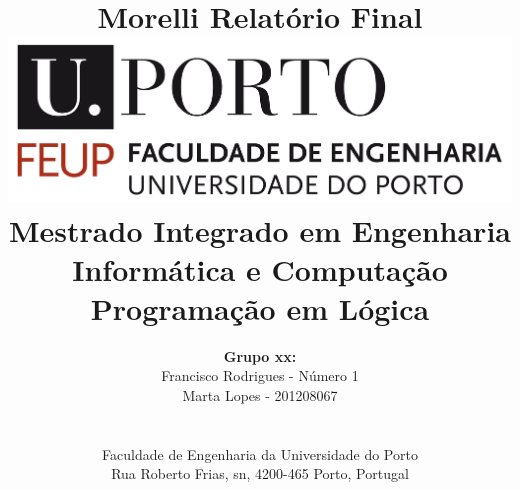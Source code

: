 \documentclass[a4paper]{article}
\begin{document}
\setlength{\textwidth}{16cm}
\setlength{\textheight}{22cm}

\title{\Huge\textbf{Morelli}\linebreak\linebreak\linebreak
\Large\textbf{Relatório Final}\linebreak\linebreak
\linebreak\linebreak
\includegraphics[scale=0.1]{feup-logo.png}\linebreak\linebreak
\linebreak\linebreak
\Large{Mestrado Integrado em Engenharia Informática e Computação} \linebreak\linebreak
\Large{Programação em Lógica}\linebreak
}

\author{\textbf{Grupo xx:}\\ Francisco Rodrigues - Número 1 \\ Marta Lopes - 201208067 \\\linebreak\linebreak \\
 \\ Faculdade de Engenharia da Universidade do Porto \\ Rua Roberto Frias, s\/n, 4200-465 Porto, Portugal \linebreak\linebreak\linebreak
\linebreak\linebreak\vspace{1cm}}
\maketitle
\thispagestyle{empty}
\end{document}
